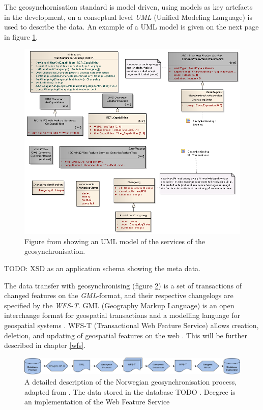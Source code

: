 The geosynchornisation standard is model driven, using models as key artefacts in the development, on a conseptual level \textit{UML} (Unified Modeling Language) is used to describe the data.
 An example of a UML model is given on the next page in figure \ref{fig:uml}.

\begin{figure}[H]
	\centering
	\includegraphics[scale=0.5]{img/uml.png}
	\caption{Figure from \cite{Kartverket2012a} showing an UML model of the services of the geosynchronisation.}
	\label{fig:uml}
\end{figure}

TODO: XSD as an application schema showing the meta data.

The data transfer with geosynchronising (figure \ref{fig:geosyncprocess}) is a set of transactions of changed features on the \textit{GML}-format, and their respective changelogs are specified by the \textit{WFS-T}. GML (Geography Markup Language) is an open interchange format for geospatial transactions and a modelling language for geospatial systems \citep{OGC2017}. WFS-T (Transactional Web Feature Service) allows creation, deletion, and updating of geospatial features on the web \citep{OGCNetwork}. This will be further described in chapter \ref{wfs}. 

\begin{figure}[H]
	\centering
	\includegraphics[scale=0.43]{img/geosynkkk.png}
	\caption{A detailed description of the Norwegian geosynchronisation process, adapted from \cite{Eggan2017}. The data stored in the database TODO . Deegree is an implementation of the Web Feature Service}
	\label{fig:geosyncprocess}
\end{figure}

